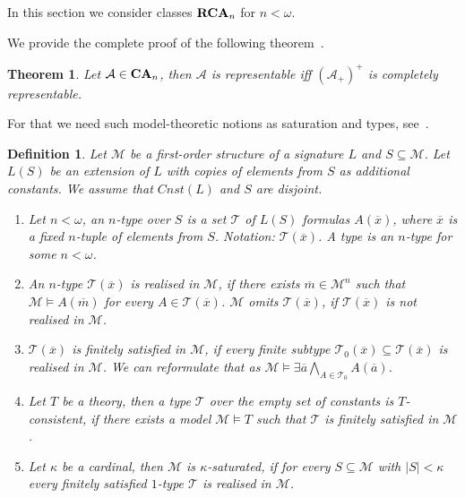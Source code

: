 \documentclass{article}
\theoremstyle{defin}
\newtheorem{definition}{Definition}
\theoremstyle{theorem}
\newtheorem{theorem}{Theorem}
\theoremstyle{claim}
\theoremstyle{prop}
\theoremstyle{lemma}
\theoremstyle{fact}
\theoremstyle{remark}
\theoremstyle{ex}
\theoremstyle{col}
\theoremstyle{question}
\begin{document}
In this section we consider classes ${\bf RCA}_n$ for $n < \omega$.

We provide the complete proof of the following theorem~\cite[Theorem 3.4.3]{hirsch2013completions}.
\begin{theorem}\label{finitecanon}
Let $\mathcal{A} \in {\bf CA}_n$, then $\mathcal{A}$ is representable iff ${(\mathcal{A}_+)}^{+}$ is completely representable.
\end{theorem}

For that we need such model-theoretic notions as saturation and types, see~\cite[Section 6.3]{hodges1993model}.

\begin{definition} Let $\mathcal{M}$ be a first-order structure of a signature $L$ and $S \subseteq \mathcal{M}$. Let $L(S)$ be an extension of $L$ with copies of elements from $S$ as additional constants. We assume that $Cnst(L)$ and $S$ are disjoint.

\begin{enumerate}
\item Let $n < \omega$, an $n$-type over $S$ is a set $\mathcal{T}$ of $L(S)$ formulas $A(\overline{x})$, where $\overline{x}$ is a fixed $n$-tuple of elements from $S$. Notation: $\mathcal{T}(\overline{x})$. A type is an $n$-type for some $n < \omega$.
\item An $n$-type $\mathcal{T}(\overline{x})$ is realised in $\mathcal{M}$, if there exists $\overline{m} \in \mathcal{M}^n$ such that $\mathcal{M} \models A(\overline{m})$ for every $A \in \mathcal{T}(\overline{x})$. $\mathcal{M}$ omits $\mathcal{T}(\overline{x})$, if $\mathcal{T}(\overline{x})$ is not realised in $\mathcal{M}$.
\item $\mathcal{T}(\overline{x})$ is finitely satisfied in $\mathcal{M}$, if every finite subtype $\mathcal{T}_0(\overline{x}) \subseteq \mathcal{T}(\overline{x})$ is realised in $\mathcal{M}$. We can reformulate that as $\mathcal{M} \models \exists \overline{a} \bigwedge \limits_{A \in \mathcal{T}_0} A(\overline{a})$.
\item Let $T$ be a theory, then a type $\mathcal{T}$ over the empty set of constants is $T$-consistent, if there exists a model $\mathcal{M} \models T$ such that $\mathcal{T}$ is finitely satisfied in $\mathcal{M}$.
\item Let $\kappa$ be a cardinal, then $\mathcal{M}$ is $\kappa$-saturated, if for every $S \subseteq \mathcal{M}$ with $|S| < \kappa$ every finitely satisfied $1$-type $\mathcal{T}$ is realised in $\mathcal{M}$.
\end{enumerate}
\end{definition}
\end{document}
